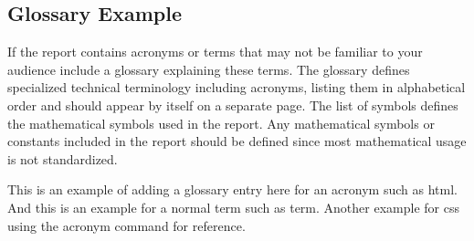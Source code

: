 \subsection{Glossary Example}

If the report contains acronyms or terms that may not be familiar to your audience include a glossary explaining these terms. The glossary defines specialized technical terminology including acronyms, listing them in alphabetical order and should appear by itself on a separate page. The list of symbols defines the mathematical symbols used in the report. Any mathematical symbols or constants included in the report should be defined since most mathematical usage is not standardized.

This is an example of adding a glossary entry here for an acronym such as \gls{html}. And this is an example for a normal term such as \gls{term}. Another example for \acrshort{css} using the acronym command for reference.
